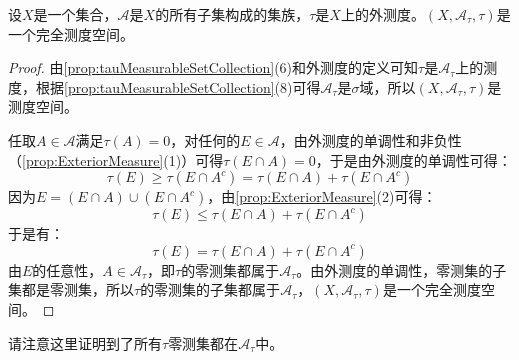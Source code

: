 \begin{theorem}\label{theo:ExteriorMeasureCompleteSpace}
	设$X$是一个集合，$\mathscr{A}$是$X$的所有子集构成的集族，$\tau$是$X$上的外测度。$(X,\mathscr{A}_{\tau},\tau)$是一个完全测度空间。
\end{theorem}
\begin{proof}
	由\cref{prop:tauMeasurableSetCollection}(6)和外测度的定义可知$\tau$是$\mathscr{A}_{\tau}$上的测度，根据\cref{prop:tauMeasurableSetCollection}(8)可得$\mathscr{A}_\tau$是$\sigma$域，所以$(X,\mathscr{A}_\tau,\tau)$是测度空间。\par
	任取$A\in \mathscr{A}$满足$\tau(A)=0$，对任何的$E\in \mathscr{A}$，由外测度的单调性和非负性（\cref{prop:ExteriorMeasure}(1)）可得$\tau(E\cap A)=0$，于是由外测度的单调性可得：
	\begin{equation*}
		\tau(E)\geqslant\tau(E\cap A^c)=\tau(E\cap A)+\tau(E\cap A^c)
	\end{equation*}
	因为$E=(E\cap A)\cup(E\cap A^c)$，由\cref{prop:ExteriorMeasure}(2)可得：
	\begin{equation*}
		\tau(E)\leqslant\tau(E\cap A)+\tau(E\cap A^c)
	\end{equation*}
	于是有：
	\begin{equation*}
		\tau(E)=\tau(E\cap A)+\tau(E\cap A^c)
	\end{equation*}
	由$E$的任意性，$A\in \mathscr{A}_{\tau}$，即$\tau$的零测集都属于$\mathscr{A}_{\tau}$。由外测度的单调性，零测集的子集都是零测集，所以$\tau$的零测集的子集都属于$\mathscr{A}_{\tau}$，$(X,\mathscr{A}_{\tau},\tau)$是一个完全测度空间。
\end{proof}
\begin{note}
	请注意这里证明到了所有$\tau$零测集都在$\mathscr{A}_\tau$中。
\end{note}

